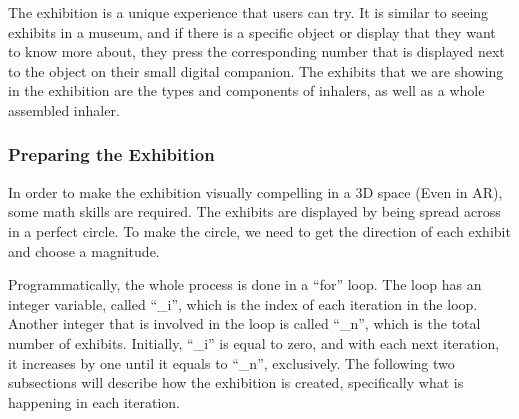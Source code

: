 The exhibition is a unique experience that users can try. It is similar to seeing exhibits in a museum, and if there is a specific object or display that they want to know more about, they press the corresponding number that is displayed next to the object on their small digital companion. The exhibits that we are showing in the exhibition are the types and components of inhalers, as well as a whole assembled inhaler.

\subsubsection*{Preparing the Exhibition}
In order to make the exhibition visually compelling in a 3D space (Even in AR), some math skills are required. The exhibits are displayed by being spread across in a perfect circle. To make the circle, we need to get the direction of each exhibit and choose a magnitude. 

Programmatically, the whole process is done in a “for\normalfont” loop. The loop has an integer variable, called “\_i\normalfont”, which is the index of each iteration in the loop. Another integer that is involved in the loop is called “\_n\normalfont”, which is the total number of exhibits. Initially, “\_i\normalfont” is equal to zero, and with each next iteration, it increases by one until it equals to “\_n\normalfont”, exclusively. The following two subsections will describe how the exhibition is created, specifically what is happening in each iteration.

